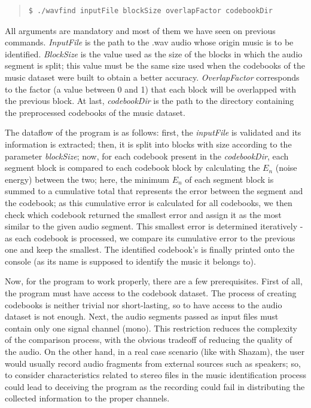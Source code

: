 \documentclass[12pt]{article}
\begin{document}
\begingroup
\addtolength\leftmargini{-0.4in}
\begin{quote}
\begin{verbatim}
$ ./wavfind inputFile blockSize overlapFactor codebookDir
\end{verbatim}
\end{quote}
\endgroup

All arguments are mandatory and most of them we have seen on previous commands. 
{\it InputFile\/} is the path to the .wav audio whose origin music is to be identified.
{\it BlockSize\/} is the value used as the size of the blocks in which the audio 
segment is split; this value must be the same size used when the codebooks of 
the music dataset were built to obtain a better accuracy.
{\it OverlapFactor\/} corresponds to the factor (a value between 0 and 1) that 
each block will be overlapped with the previous block.
At last, {\it codebookDir\/} is the path to the directory containing the 
preprocessed codebooks of the music dataset.

The dataflow of the program is as follows:
first, the {\it inputFile\/} is validated and its information is extracted; 
then, it is split into blocks with size according to the parameter {\it blockSize\/}; 
now, for each codebook present in the {\it codebookDir\/}, each segment block 
is compared to each codebook block by calculating the $E_n$ (noise energy) 
between the two;
here, the minimum $E_n$ of each segment block is summed to a cumulative total
that represents the error between the segment and the codebook;
as this cumulative error is calculated for all codebooks, we then check which 
codebook returned the smallest error and assign it as the most similar to the
given audio segment.
This smallest error is determined iteratively - as each codebook is processed, 
we compare its cumulative error to the previous one and keep the smallest.
The identified codebook's is finally printed onto the console (as its name is 
supposed to identify the music it belongs to).

\newpage
Now, for the program to work properly, there are a few prerequisites.
First of all, the program must have access to the codebook dataset.
The process of creating codebooks is neither trivial nor short-lasting, so to 
have access to the audio dataset is not enough.
Next, the audio segments passed as input files must contain only one signal 
channel (mono).
This restriction reduces the complexity of the comparison process, with the
obvious tradeoff of reducing the quality of the audio.
On the other hand, in a real case scenario (like with Shazam), the user would
usually record audio fragments from external sources such as speakers; so, to 
consider characteristics related to stereo files in the music identification 
process could lead to deceiving the program as the recording could fail in 
distributing the collected information to the proper channels.
\end{document}
